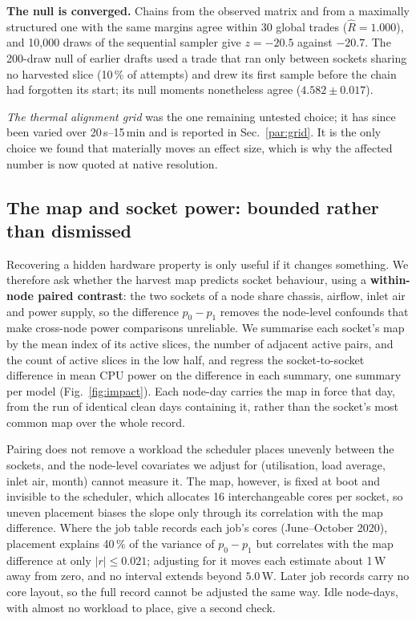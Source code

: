 \documentclass[10pt,conference]{IEEEtran}
\begin{document}
\textbf{The null is converged.} Chains from the observed matrix and from a maximally structured
one with the same margins agree within 30 global trades ($\hat R=1.000$), and 10{,}000 draws of the
sequential sampler give $z=-20.5$ against $-20.7$. The 200-draw null of earlier drafts used a trade
that ran only between sockets sharing no harvested slice (10\,\% of attempts) and drew its first
sample before the chain had forgotten its start; its null moments nonetheless agree
($4.582\pm0.017$).

\emph{The thermal alignment grid} was the one remaining untested choice; it has since been varied
over 20\,s--15\,min and is reported in Sec.~\ref{par:grid}. It is the only choice we found that
materially moves an effect size, which is why the affected number is now quoted at native
resolution.

\subsection{The map and socket power: bounded rather than dismissed}
\label{sec:impact}
Recovering a hidden hardware property is only useful if it changes something. We therefore ask
whether the harvest map predicts socket behaviour, using a \textbf{within-node paired contrast}:
the two sockets of a node share chassis, airflow, inlet air and power supply, so the difference
$p_0-p_1$ removes the node-level confounds that make cross-node power comparisons unreliable. We
summarise each socket's map by the mean index of its active slices, the number of adjacent active
pairs, and the count of active slices in the low half, and regress the socket-to-socket difference
in mean CPU power on the difference in each summary, one summary per model
(Fig.~\ref{fig:impact}). Each node-day carries the map in force that day, from the run of
identical clean days containing it, rather than the socket's most common map over the whole
record.

Pairing does not remove a workload the scheduler places unevenly between the sockets, and the
node-level covariates we adjust for (utilisation, load average, inlet air, month) cannot measure it.
The map, however, is fixed at boot and invisible to the scheduler, which allocates 16
interchangeable cores per socket, so uneven placement biases the slope only through its
correlation with the map difference. Where the job table records each job's cores (June--October
2020), placement explains 40\,\% of the variance of $p_0-p_1$ but correlates with the map
difference at only $|r|\le0.021$; adjusting for it moves each estimate about 1\,W away from
zero, and no interval extends beyond $5.0$\,W. Later job records carry no core layout, so the
full record cannot be adjusted the same way. Idle node-days, with almost no workload to place,
give a second check.
\end{document}
